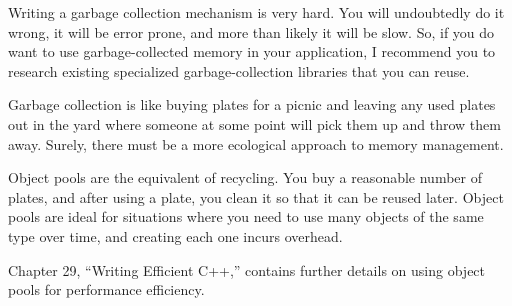 Writing a garbage collection mechanism is very hard. You will undoubtedly do it wrong, it will be error prone, and more than likely it will be slow. So, if you do want to use garbage-collected memory in your application, I recommend you to research existing specialized garbage-collection libraries that you can reuse.


Garbage collection is like buying plates for a picnic and leaving any used plates out in the yard where someone at some point will pick them up and throw them away. Surely, there must be a more ecological approach to memory management.

Object pools are the equivalent of recycling. You buy a reasonable number of plates, and after using a plate, you clean it so that it can be reused later. Object pools are ideal for situations where you need to use many objects of the same type over time, and creating each one incurs overhead.

Chapter 29, “Writing Efficient C++,” contains further details on using object pools for performance efficiency.















